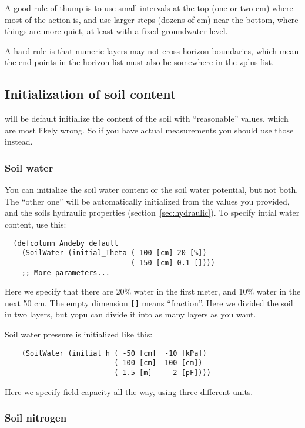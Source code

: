 \documentclass[a4paper,11pt]{article}
\begin{document}
A good rule of thump is to use small intervals at the top (one or two
cm) where most of the action is, and use larger steps (dozens of cm)
near the bottom, where things are more quiet, at least with a fixed
groundwater level.

A hard rule is that numeric layers may not cross horizon boundaries,
which mean the end points in the horizon list must also be somewhere
in the zplus list.

\subsection{Initialization of soil content}
\label{sec:init}

\Daisy{} will be default initialize the content of the soil with
``reasonable'' values, which are most likely wrong.  So if you have
actual measurements you should use those instead.  

\subsubsection{Soil water}

You can initialize the soil water content or the soil water potential,
but not both.  The ``other one'' will be automatically initialized
from the values you provided, and the soils hydraulic properties
(section~\ref{sec:hydraulic}).  To specify intial water content, use
this: 
\begin{verbatim}
  (defcolumn Andeby default
    (SoilWater (initial_Theta (-100 [cm] 20 [%])
                              (-150 [cm] 0.1 [])))
    ;; More parameters...
\end{verbatim}
Here we specify that there are 20\% water in the first meter, and
10\% water in the next 50 cm.  The empty dimension \verb|[]| means
``fraction''.  Here we divided the soil in two layers, but yopu can
divide it into as many layers as you want.  

Soil water pressure is initialized like this:
\begin{verbatim}
    (SoilWater (initial_h ( -50 [cm]  -10 [kPa])
                          (-100 [cm] -100 [cm])
                          (-1.5 [m]     2 [pF])))
\end{verbatim}
Here we specify field capacity all the way, using three different
units. 

\subsubsection{Soil nitrogen}
\end{document}
